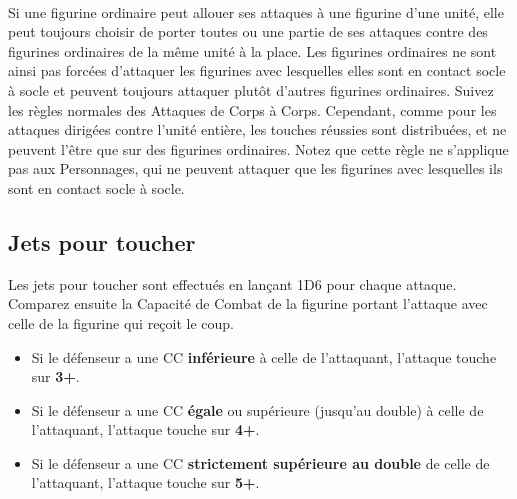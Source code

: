 
\paragraph{\newfromWHB{\swirlingmelee}}

Si une figurine ordinaire peut allouer ses attaques à une figurine d'une unité, elle peut toujours choisir de porter toutes ou une partie de ses attaques contre des figurines ordinaires de la même unité à la place. Les figurines ordinaires ne sont ainsi pas forcées d'attaquer les figurines avec lesquelles elles sont en contact socle à socle et peuvent toujours attaquer plutôt d'autres figurines ordinaires. Suivez les règles normales des Attaques de Corps à Corps. Cependant, comme pour les attaques dirigées contre l'unité entière, les touches réussies sont distribuées, et ne peuvent l'être que sur des figurines ordinaires. Notez que cette règle ne s'applique pas aux Personnages, qui ne peuvent attaquer que les figurines avec lesquelles ils sont en contact socle à socle.

\subsection{Jets pour toucher}

Les jets pour toucher sont effectués en lançant 1D6 pour chaque attaque. Comparez ensuite la Capacité de Combat de la figurine portant l'attaque avec celle de la figurine qui reçoit le coup.
\begin{itemize}[label={-}]
\item Si le défenseur a une CC \textbf{inférieure} à celle de l'attaquant, l'attaque touche sur \textbf{3+}.
\item Si le défenseur a une CC \textbf{égale} ou supérieure (jusqu'au double) à celle de l'attaquant, l'attaque touche sur \textbf{4+}.
\item Si le défenseur a une CC \textbf{strictement supérieure au double} de celle de l'attaquant, l'attaque touche sur \textbf{5+}.
\end{itemize}

